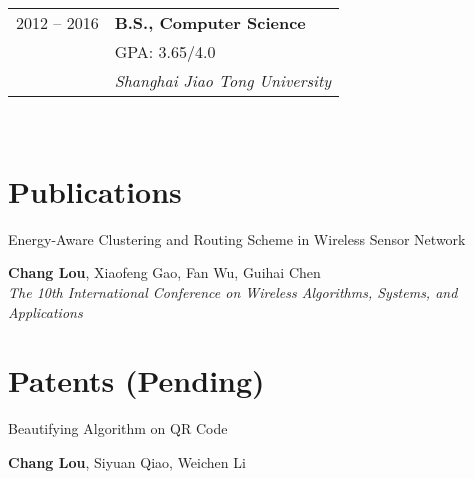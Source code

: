 \documentclass[10pt]{article} %
\begin{document}
{\begin{minipage}[t]{0.44\textwidth}
\begin{tabular}{rl}
2012 -- 2016 & \textbf{B.S., Computer Science} \\ 
& \textsc{GPA: 3.65/4.0} \\ 
& \textit{Shanghai Jiao Tong University}\\

	

\end{tabular}\\[10pt]




\section{Publications} 




{\raggedright\large Energy-Aware Clustering and Routing Scheme in Wireless Sensor Network\\
[5pt]}
\normalsize{\textbf{Chang Lou}, Xiaofeng Gao, Fan Wu, Guihai Chen}\\
\textit{The 10th International Conference on Wireless Algorithms, Systems, and Applications}\\ 


\section{Patents (Pending)} 




{\raggedright\large Beautifying Algorithm on QR Code\\
[5pt]}
\normalsize{\textbf{Chang Lou}, Siyuan Qiao, Weichen Li}\\ 




\end{minipage}}
\end{document}
